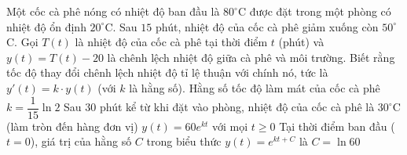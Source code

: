 \begin{ex}%
	Một cốc cà phê nóng có nhiệt độ ban đầu là $80^\circ$C được đặt trong một phòng có nhiệt độ ổn định $20^\circ$C. Sau $15$ phút, nhiệt độ của cốc cà phê giảm xuống còn $50^\circ$C. Gọi $T(t)$ là nhiệt độ của cốc cà phê tại thời điểm $t$ (phút) và $y(t)=T(t)-20$ là chênh lệch nhiệt độ giữa cà phê và môi trường. Biết rằng tốc độ thay đổi chênh lệch nhiệt độ tỉ lệ thuận với chính nó, tức là $y'(t)=k\cdot y(t)$ (với $k$ là hằng số).
	\choiceTF
	{\True Hằng số tốc độ làm mát của cốc cà phê $k=\dfrac{1}{15}\ln 2$}
	{Sau $30$ phút kể từ khi đặt vào phòng, nhiệt độ của cốc cà phê là $30^\circ$C (làm tròn đến hàng đơn vị)}
	{\True $y(t)=60e^{kt}$ với mọi $t \ge 0$}
	{\True Tại thời điểm ban đầu ($t=0$), giá trị của hằng số $C$ trong biểu thức $y(t)=e^{kt+C}$ là $C=\ln 60$}
\end{ex}

